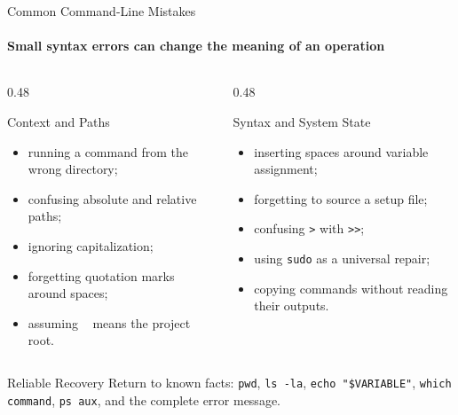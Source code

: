 \begin{frame}{Common Command-Line Mistakes}
\framesubtitle{Small syntax errors can change the meaning of an operation}

\scriptsize

\begin{columns}[T,onlytextwidth]
    \begin{column}{0.48\textwidth}
        \begin{block}{Context and Paths}
            \begin{itemize}
                \setlength{\itemsep}{0.18em}
                \item running a command from the wrong directory;
                \item confusing absolute and relative paths;
                \item ignoring capitalization;
                \item forgetting quotation marks around spaces;
                \item assuming \texttt{~} means the project root.
            \end{itemize}
        \end{block}
    \end{column}

    \begin{column}{0.48\textwidth}
        \begin{block}{Syntax and System State}
            \begin{itemize}
                \setlength{\itemsep}{0.18em}
                \item inserting spaces around variable assignment;
                \item forgetting to source a setup file;
                \item confusing \texttt{>} with \texttt{>>};
                \item using \texttt{sudo} as a universal repair;
                \item copying commands without reading their outputs.
            \end{itemize}
        \end{block}
    \end{column}
\end{columns}

\begin{alertblock}{Reliable Recovery}
Return to known facts: \texttt{pwd}, \texttt{ls -la}, \texttt{echo "\$VARIABLE"},
\texttt{which command}, \texttt{ps aux}, and the complete error message.
\end{alertblock}
\end{frame}









